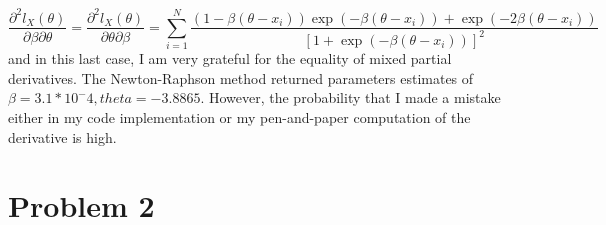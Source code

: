 \documentclass[a4paper,12pt]{article}
\begin{document}
\begin{enumerate}
\begin{equation}
\frac{\partial^{2}l_{X}(\theta)}{\partial \beta \partial \theta} = \frac{\partial^{2}l_{X}(\theta)}{\partial \theta \partial \beta} = \sum_{i = 1}^{N}{ \frac{  (1-\beta (\theta - x_{i})) \exp(-\beta (\theta -x_{i})) + \exp(-2\beta (\theta -x_{i}))   }    { \left[  1 + \exp(-\beta (\theta -x_{i}))   \right]^{2}  }    }
\end{equation}
and in this last case, I am very grateful for the equality of mixed partial derivatives. The Newton-Raphson method returned parameters estimates of $\beta = 3.1*10^-4, theta = -3.8865$. However, the probability that I made a mistake either in my code implementation or my pen-and-paper computation of the derivative is high. 

\end{enumerate}

\section{Problem 2}
\end{document}
